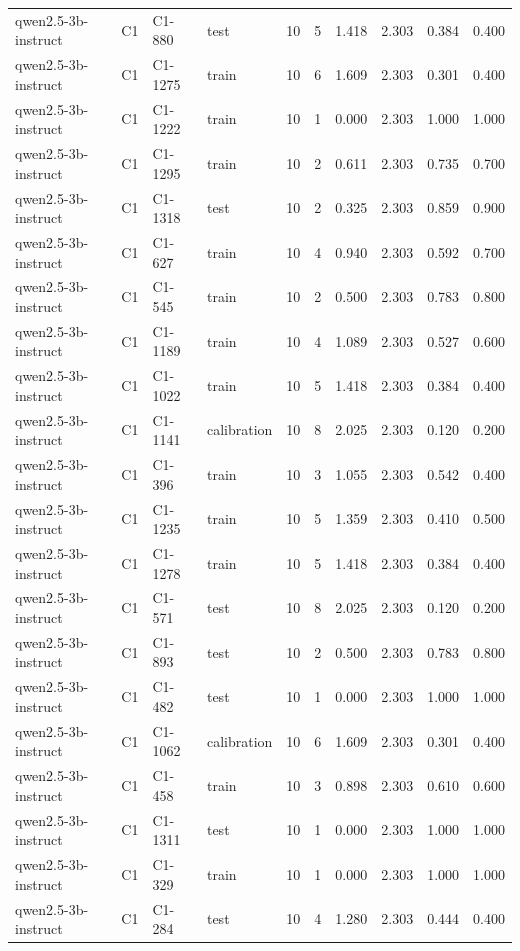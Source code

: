 \begin{table}
\begin{tabular}{llllrrrrrr}
qwen2.5-3b-instruct & C1 & C1-880 & test & 10 & 5 & 1.418 & 2.303 & 0.384 & 0.400 \\
qwen2.5-3b-instruct & C1 & C1-1275 & train & 10 & 6 & 1.609 & 2.303 & 0.301 & 0.400 \\
qwen2.5-3b-instruct & C1 & C1-1222 & train & 10 & 1 & 0.000 & 2.303 & 1.000 & 1.000 \\
qwen2.5-3b-instruct & C1 & C1-1295 & train & 10 & 2 & 0.611 & 2.303 & 0.735 & 0.700 \\
qwen2.5-3b-instruct & C1 & C1-1318 & test & 10 & 2 & 0.325 & 2.303 & 0.859 & 0.900 \\
qwen2.5-3b-instruct & C1 & C1-627 & train & 10 & 4 & 0.940 & 2.303 & 0.592 & 0.700 \\
qwen2.5-3b-instruct & C1 & C1-545 & train & 10 & 2 & 0.500 & 2.303 & 0.783 & 0.800 \\
qwen2.5-3b-instruct & C1 & C1-1189 & train & 10 & 4 & 1.089 & 2.303 & 0.527 & 0.600 \\
qwen2.5-3b-instruct & C1 & C1-1022 & train & 10 & 5 & 1.418 & 2.303 & 0.384 & 0.400 \\
qwen2.5-3b-instruct & C1 & C1-1141 & calibration & 10 & 8 & 2.025 & 2.303 & 0.120 & 0.200 \\
qwen2.5-3b-instruct & C1 & C1-396 & train & 10 & 3 & 1.055 & 2.303 & 0.542 & 0.400 \\
qwen2.5-3b-instruct & C1 & C1-1235 & train & 10 & 5 & 1.359 & 2.303 & 0.410 & 0.500 \\
qwen2.5-3b-instruct & C1 & C1-1278 & train & 10 & 5 & 1.418 & 2.303 & 0.384 & 0.400 \\
qwen2.5-3b-instruct & C1 & C1-571 & test & 10 & 8 & 2.025 & 2.303 & 0.120 & 0.200 \\
qwen2.5-3b-instruct & C1 & C1-893 & test & 10 & 2 & 0.500 & 2.303 & 0.783 & 0.800 \\
qwen2.5-3b-instruct & C1 & C1-482 & test & 10 & 1 & 0.000 & 2.303 & 1.000 & 1.000 \\
qwen2.5-3b-instruct & C1 & C1-1062 & calibration & 10 & 6 & 1.609 & 2.303 & 0.301 & 0.400 \\
qwen2.5-3b-instruct & C1 & C1-458 & train & 10 & 3 & 0.898 & 2.303 & 0.610 & 0.600 \\
qwen2.5-3b-instruct & C1 & C1-1311 & test & 10 & 1 & 0.000 & 2.303 & 1.000 & 1.000 \\
qwen2.5-3b-instruct & C1 & C1-329 & train & 10 & 1 & 0.000 & 2.303 & 1.000 & 1.000 \\
qwen2.5-3b-instruct & C1 & C1-284 & test & 10 & 4 & 1.280 & 2.303 & 0.444 & 0.400 \\

\end{tabular}
\end{table}
